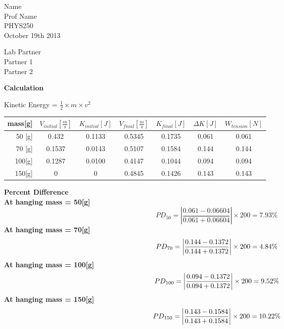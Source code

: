 \documentclass[12pt,letterpaper,fleqn]{article}
\begin{document}
\large
\parbox{20em}{
Name\\
Prof Name\\ 
PHYS250\\
October 19th 2013\\
}\hfill
\parbox{10em}{
Lab Partner\\
Partner 1\\
Partner 2\\
}

\begin{center}
	{\LARGE\bf Calculation}
\end{center}

	Kinetic Energy = $\frac{1}{2}\times m\times v^2$\\


\begin{table}[htb]
\scalebox{1.25}
{
  \begin{tabular}{|r||c|c|c|c|c|c|}\hline
    mass[g] & $V_{initial}[\frac{m}{s}]$ &$K_{initial}[J]$ & $V_{final}[\frac{m}{s}]$& $K_{final}[J]$&$\Delta K[J]$&$W_{tension}[N]$ \\\hline
    50 [g]   &0.432  & 0.1133 & 0.5345 & 0.1735 & 0.061 & 0.061\\\hline
    70 [g]   &0.1537 & 0.0143 & 0.5107 & 0.1584 & 0.144 & 0.144\\\hline
    100[g]  &0.1287 & 0.0100 & 0.4147 & 0.1044 & 0.094 & 0.094\\\hline
    150[g]  &0      & 0      & 0.4845 & 0.1426 & 0.143 &0.143\\\hline
  \end{tabular}
}
\end{table}

\bf Percent Difference\\

At hanging mass = 50[g]\\
\[
PD_{50} = \left|\frac{0.061-0.06604}{0.061+0.06604}\right|\times200=7.93\%
\]
At hanging mass = 70[g]\\
\[
PD_{70} = \left|\frac{0.144-0.1372}{0.144+0.1372}\right|\times200=4.84\%\\
\]
At hanging mass = 100[g]\\
\[
PD_{100} = \left|\frac{0.094-0.1372}{0.094+0.1372}\right|\times200=9.52\%\\
\]
At hanging mass = 150[g]\\
\[
PD_{150} = \left|\frac{0.143-0.1584}{0.143+0.1584}\right|\times200=10.22\%\\
\]
\end{document}
